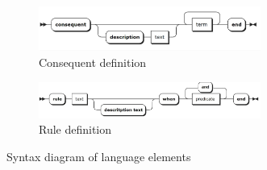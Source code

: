 \begin{figure}[!h]
    \begin{subfigure}[b]{0.9\textwidth}
        	\centering
        	\includegraphics[width=0.8\textwidth]{images/consequent}
		\caption{Consequent definition}
    \end{subfigure}
    
    \begin{subfigure}[b]{0.9\textwidth}
        	\centering
        	\includegraphics[width=0.8\textwidth]{images/rule}
		\caption{Rule definition}
    \end{subfigure}
    
	\caption{Syntax diagram of language elements}
	\label{fig:railroad}
\end{figure}

